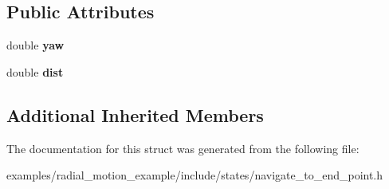 \subsection*{Public Attributes}
\begin{DoxyCompactItemize}
\item 
\hypertarget{structNavigateToEndPoint_1_1Navigate_aeb3886a6421a3784e7ac74e097da64cf}{double {\bfseries yaw}}\label{structNavigateToEndPoint_1_1Navigate_aeb3886a6421a3784e7ac74e097da64cf}

\item 
\hypertarget{structNavigateToEndPoint_1_1Navigate_a12b46aba729c97adb1b1bfec87ec166a}{double {\bfseries dist}}\label{structNavigateToEndPoint_1_1Navigate_a12b46aba729c97adb1b1bfec87ec166a}

\end{DoxyCompactItemize}
\subsection*{Additional Inherited Members}


The documentation for this struct was generated from the following file\-:\begin{DoxyCompactItemize}
\item 
examples/radial\-\_\-motion\-\_\-example/include/states/navigate\-\_\-to\-\_\-end\-\_\-point.\-h\end{DoxyCompactItemize}
